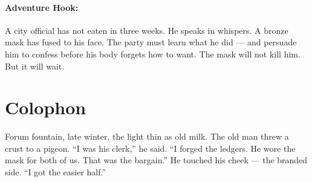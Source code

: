 \paragraph{Adventure Hook:}
A city official has not eaten in three weeks. He speaks in whispers. A bronze mask has fused to his face. The party must learn what he did --- and persuade him to confess before his body forgets how to want. The mask will not kill him. But it will wait.

\section*{Colophon}
Forum fountain, late winter, the light thin as old milk. The old man threw a crust to a pigeon. ``I was his clerk,'' he said. ``I forged the ledgers. He wore the mask for both of us. That was the bargain.'' He touched his cheek --- the branded side. ``I got the easier half.''